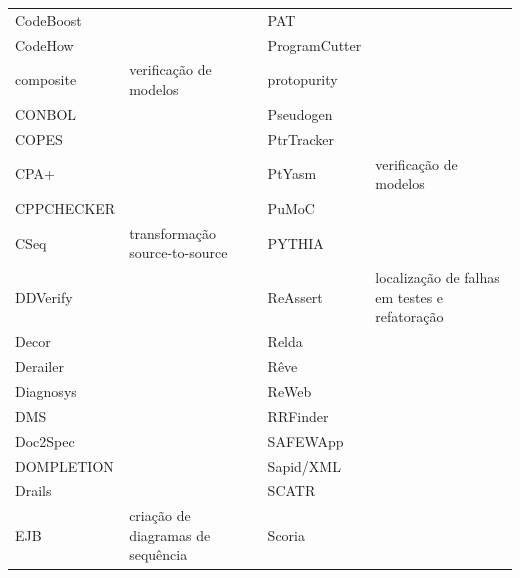 \begin{table}[H]
{\begin{tabular}{| l | l | l | l |}
  CodeBoost           &                                  & PAT                 &                                      \\
  CodeHow             &                                  & ProgramCutter       &                                      \\
  composite           & verificação de modelos           & protopurity         &                                      \\
  CONBOL              &                                  & Pseudogen           &                                      \\
  COPES               &                                  & PtrTracker          &                                      \\
  CPA+                &                                  & PtYasm              & verificação de modelos               \\
  CPPCHECKER          &                                  & PuMoC               &                                      \\
  CSeq                & transformação source-to-source   & PYTHIA              &                                      \\
  DDVerify            &                                  & ReAssert            & localização de falhas em testes e refatoração \\
  Decor               &                                  & Relda               &                                      \\
  Derailer            &                                  & Rêve                &                                      \\
  Diagnosys           &                                  & ReWeb               &                                      \\
  DMS                 &                                  & RRFinder            &                                      \\
  Doc2Spec            &                                  & SAFEWApp            &                                      \\
  DOMPLETION          &                                  & Sapid/XML           &                                      \\
  Drails              &                                  & SCATR               &                                      \\
  EJB                 & criação de diagramas de sequência& Scoria              &                                      \\

\end{tabular}}
\end{table}
